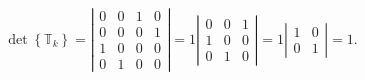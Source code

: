 \documentclass[aps, preprint]{revtex4}
\begin{document}
\begin{equation}\det \left \{\mathbb{T}_{k}\right \} =\left \vert \begin{array}{cccc}0 & 0 & 1 & 0 \\
0 & 0 & 0 & 1 \\
1 & 0 & 0 & 0 \\
0 & 1 & 0 & 0\end{array}\right \vert  =1 \left \vert \begin{array}{ccc}0 & 0 & 1 \\
1 & 0 & 0 \\
0 & 1 & 0\end{array}\right \vert  =1 \left \vert \begin{array}{cc}1 & 0 \\
0 & 1\end{array}\right \vert  =1.
\end{equation}
\end{document}

